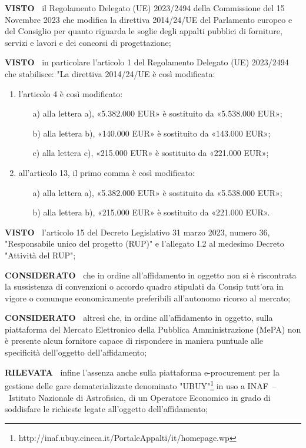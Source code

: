 \textbf{VISTO~} il Regolamento Delegato (UE)
2023/2494 della Commissione del 15 Novembre 2023 che modifica la direttiva
2014/24/UE del Parlamento europeo e del Consiglio per quanto riguarda
le soglie degli appalti pubblici di forniture, servizi e lavori e dei
concorsi di progettazione;

\textbf{VISTO~}  in particolare l'articolo 1 del Regolamento Delegato (UE)
2023/2494 che stabilisce: "La direttiva 2014/24/UE è così modificata: 

\begin{enumerate}
\item l'articolo 4 è così modificato: 
\begin{enumerate}
\item[a)]  alla lettera a), «5.382.000 EUR» è sostituito da «5.538.000 EUR»;
\item[b)]  alla lettera b), «140.000 EUR» è sostituito da «143.000 EUR»; 
\item[c)]  alla lettera c), «215.000 EUR» è sostituito da «221.000 EUR»; 
\end{enumerate}

\item all'articolo 13, il primo comma è così modificato: 
\begin{enumerate}
\item[a)]  alla lettera a), «5.382.000 EUR» è sostituito da «5.538.000 EUR»; 
\item[b)]  alla lettera b), «215.000 EUR» è sostituito da «221.000 EUR».
\end{enumerate}
\end{enumerate}

\textbf{VISTO~} l'articolo 15 del Decreto Legislativo 31
marzo 2023, numero 36, "Responsabile unico del progetto (RUP)" e
l'allegato I.2 al medesimo Decreto "Attività del RUP";

\textbf{CONSIDERATO~} che in ordine all'affidamento in oggetto
non si è riscontrata la sussistenza di convenzioni o accordo quadro
stipulati da Consip tutt'ora in vigore o comunque economicamente
preferibili all'autonomo ricorso al mercato;

\textbf{CONSIDERATO~} altresì che, in ordine
all'affidamento in oggetto, sulla piattaforma del Mercato Elettronico
della Pubblica Amministrazione (MePA) non è presente alcun fornitore
capace di rispondere in maniera puntuale alle specificità dell'oggetto
dell'affidamento;

\textbf{RILEVATA~} infine l'assenza anche sulla piattaforma e-procurement per la
gestione delle gare dematerializzate denominato
"UBUY"\footnote{http://inaf.ubuy.cineca.it/PortaleAppalti/it/homepage.wp} in uso a
INAF~–~Istituto Nazionale di Astrofisica, di un Operatore Economico in
grado di soddisfare le richieste legate all'oggetto dell'affidamento;

